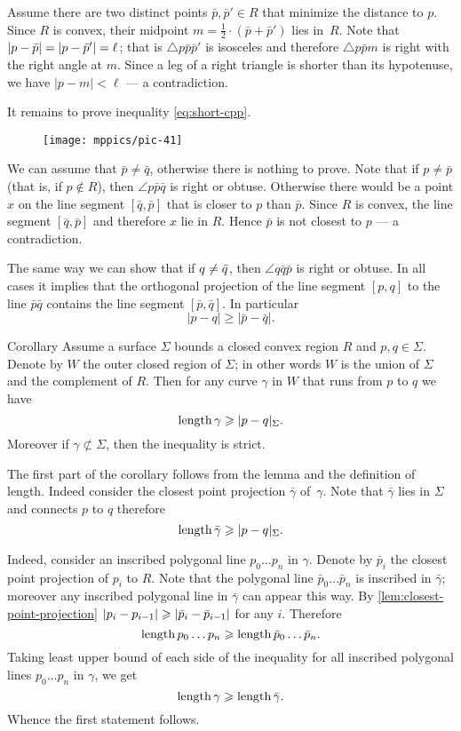 Assume there are two distinct points $\bar p, \bar p'\in R$ that minimize the distance to $p$.
Since $R$ is convex, their midpoint $m=\tfrac12\cdot (\bar p+\bar p')$ lies in~$R$.
Note that $|p-\bar p|\z=|p-\bar p'|=\ell$; that is $\triangle p\bar p\bar p'$ is isosceles and therefore $\triangle p\bar p m$ is right with the right angle at $m$.
Since a leg of a right triangle is shorter than its hypotenuse, we have $|p-m|<\ell$ --- a contradiction. 

It remains to prove inequality \ref{eq:short-cpp}.

\begin{wrapfigure}{o}{37 mm}
\vskip-0mm
\centering
\texttt{[image: mppics/pic-41]}
\vskip-0mm
\end{wrapfigure}

We can assume that $\bar p\ne\bar q$, otherwise there is nothing to prove.
Note that if $p\ne \bar p$ (that is, if $p\notin R$), 
then $\angle p \bar p \bar q$ is right or obtuse.
Otherwise there would be a point $x$ on the line segment $[\bar q,\bar p]$ that is closer to $p$ than $\bar p$.
Since $R$ is convex, the line segment $[\bar q,\bar p]$ and therefore $x$ lie in $R$.
Hence $\bar p$ is not closest to $p$ --- a contradiction.

The same way we can show that  if $q\z\ne \bar q$, then $\angle q \bar q \bar p$ is right or obtuse.
In all cases it implies that the orthogonal projection of the line segment $[p,q]$ to the line $\bar p\bar q$ contains the line segment $[\bar p,\bar q]$.
In particular 
\[|p-q|\ge |\bar p-\bar q|.\]
\qedsf

\begin{thm}{Corollary}
Assume a surface $\Sigma$ bounds a closed convex region $R$ and  $p,q \in \Sigma$.
Denote by $W$ the outer closed region of $\Sigma$; in other words $W$ is the union of $\Sigma$ and the complement of $R$.
Then for any curve $\gamma$ in $W$ that runs from $p$ to $q$ we have
\[\mathop{\rm length}\nolimits\gamma\geqslant |p-q|_\Sigma.\]
Moreover if  $\gamma\not\subset\Sigma$, then the inequality is strict.
\end{thm}

The first part of the corollary follows from the lemma and the definition of length.
Indeed consider the closest point projection $\bar\gamma$ of~$\gamma$.
Note that $\bar\gamma$ lies in $\Sigma$ and connects $p$ to $q$ therefore 
\[\mathop{\rm length}\nolimits\bar\gamma\geqslant |p-q|_\Sigma.\]

Indeed, consider an inscribed polygonal line $p_0\dots p_n$ in $\gamma$.
Denote by $\bar p_i$ the closest point projection of $p_i$ to $R$.
Note that the polygonal line  $\bar p_0\dots \bar p_n$ is inscribed in $\bar\gamma$;
moreover any inscribed polygonal line in $\bar\gamma$ can appear this way.
By \ref{lem:closest-point-projection} $|p_i-p_{i-1}|\z\ge|\bar p_i-\bar p_{i-1}|$ for any $i$.
Therefore 
\[\mathop{\rm length}\nolimits p_0\dots p_n\geqslant \mathop{\rm length}\nolimits \bar p_0\dots \bar p_n.\]
Taking least upper bound of each side of the inequality for all inscribed polygonal lines $p_0\dots p_n$ in $\gamma$, we get
\[\mathop{\rm length}\nolimits\gamma\geqslant\mathop{\rm length}\nolimits\bar\gamma.\]
Whence the first statement follows.

